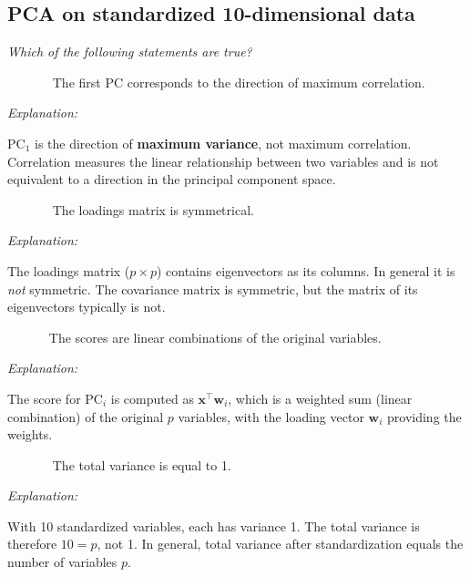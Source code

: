 \documentclass[12pt, a4paper]{article}
\newcommand{\truelabel}{\textcolor{white}{\colorbox{truegreen}{\textbf{TRUE}}}}
\newcommand{\falselabel}{\textcolor{white}{\colorbox{falsered}{\textbf{FALSE}}}}
\newenvironment{statement}[1]{%
  \par\medskip
  \noindent #1\par\smallskip
  \noindent
}{\par}
\newenvironment{explanation}{%
  \noindent\small\color{headergray}\textit{Explanation: }%
}{\par}
\begin{document}
\subsection{PCA on standardized 10-dimensional data}

\textit{Which of the following statements are true?}

\bigskip

\begin{statement}{\falselabel\quad The first PC corresponds to the direction of maximum correlation.}
\begin{explanation}
PC$_1$ is the direction of \textbf{maximum variance}, not maximum correlation. Correlation measures the linear relationship between two variables and is not equivalent to a direction in the principal component space.
\end{explanation}
\end{statement}

\begin{statement}{\falselabel\quad The loadings matrix is symmetrical.}
\begin{explanation}
The loadings matrix ($p \times p$) contains eigenvectors as its columns. In general it is \emph{not} symmetric. The covariance matrix is symmetric, but the matrix of its eigenvectors typically is not.
\end{explanation}
\end{statement}

\begin{statement}{\truelabel\quad The scores are linear combinations of the original variables.}
\begin{explanation}
The score for PC$_i$ is computed as $\mathbf{x}^\top \mathbf{w}_i$, which is a weighted sum (linear combination) of the original $p$ variables, with the loading vector $\mathbf{w}_i$ providing the weights.
\end{explanation}
\end{statement}

\begin{statement}{\falselabel\quad The total variance is equal to 1.}
\begin{explanation}
With 10 standardized variables, each has variance 1. The total variance is therefore $10 = p$, not 1. In general, total variance after standardization equals the number of variables $p$.
\end{explanation}
\end{statement}
\end{document}
